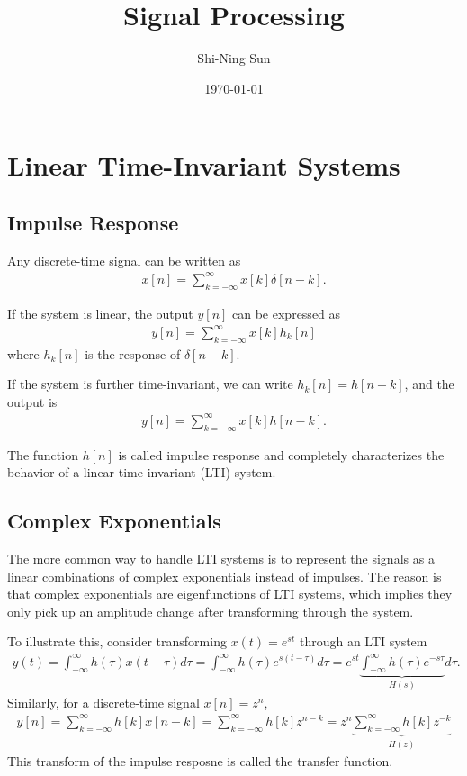 \documentclass{article}
\begin{document}
\title{Signal Processing}
\author{Shi-Ning Sun}
\date{\today}
\maketitle

\section{Linear Time-Invariant Systems}

\subsection{Impulse Response}

Any discrete-time signal can be written as
\begin{align}
    x[n] = \sum_{k=-\infty}^\infty x[k]\delta[n-k].
\end{align}

If the system is linear, the output $y[n]$ can be expressed as
\begin{align}
    y[n] = \sum_{k=-\infty}^\infty x[k] h_k[n]
\end{align}
where $h_k[n]$ is the response of $\delta[n-k]$.

If the system is further time-invariant, we can write $h_k[n] = h[n - k]$, and the output is
\begin{align}
    y[n] = \sum_{k=-\infty}^\infty x[k] h[n-k].
\end{align}

The function $h[n]$ is called impulse response and completely characterizes the behavior of 
a linear time-invariant (LTI) system.

\subsection{Complex Exponentials}

The more common way to handle LTI systems is to represent the signals as a linear combinations
of complex exponentials instead of impulses. The reason is that complex exponentials are 
eigenfunctions of LTI systems, which implies they only pick up an amplitude change after
transforming through the system. 

To illustrate this, consider transforming $x(t) = e^{st}$ through an LTI system
\begin{align}
    y(t) = \int_{-\infty}^\infty h(\tau) x(t-\tau) d\tau = \int_{-\infty}^\infty h(\tau) e^{s(t-\tau)} d\tau
    = e^{st} \underbrace{\int_{-\infty}^\infty h(\tau) e^{-s\tau}}_{H(s)} d\tau.
\end{align}
Similarly, for a discrete-time signal $x[n] = z^n$,
\begin{align}
    y[n] = \sum_{k=-\infty}^\infty h[k] x[n-k] = \sum_{k=-\infty}^\infty h[k] z^{n-k} = z^n 
    \underbrace{\sum_{k=-\infty}^\infty h[k]z^{-k}}_{H(z)}
\end{align}
This transform of the impulse resposne is called the transfer function.
\end{document}
